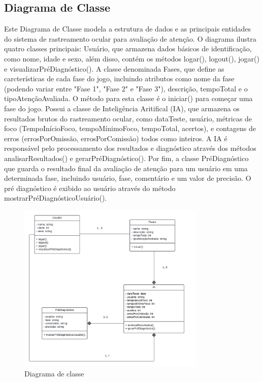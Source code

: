 \documentclass[
  a4paper,%
  12pt,%
  english,%
  brazilian,%
]{article}
\begin{document}
    \subsection*{Diagrama de Classe}

    Este Diagrama de Classe modela a estrutura de dados e as principais entidades do sistema de rastreamento ocular para avaliação de atenção.
    O diagrama ilustra quatro classes principais: Usuário, que armazena dados básicos de identificação, como nome, idade e sexo, além disso, contém os métodos logar(), logout(), jogar() e visualizarPréDiagnóstico(). A classe denominada Fases, que define as carcterísticas de cada fase do jogo, incluindo atributos como nome da fase (podendo variar entre "Fase 1", "Fase 2" e "Fase 3"), descrição, tempoTotal e o tipoAtençãoAvaliada. O método para esta classe é o iniciar() para começar uma fase do jogo. Possui a classe de Inteligência Aritifical (IA), que armazena os resultados brutos do rastreamento ocular, como dataTeste, usuário, métricas de foco (TempoInícioFoco, tempoMínimoFoco, tempoTotal, acertos), e contagens de erros (errosPorOmissão, errosPorComissão) todos como inteiros. A IA é responsável pelo processamento dos resultados e diagnóstico através dos métodos analisarResultados() e gerarPréDiagnóstico(). Por fim, a classe PréDiagnóstico que guarda o resultado final da avaliação de atenção para um usuário em uma determinada fase, incluindo usuário, fase, comentário e um valor de precisão. O pré diagnóstico é exibido ao usuário através do método mostrarPréDiagnósticoUsuário().

    \begin{figure}[H]
\centering
\caption{Diagrama de classe}%
\label{fig:diagrama-de-classe}
\includegraphics[width=0.8\textwidth]{Logos/diagrama-de-classe.png}
\end{figure}
\end{document}
